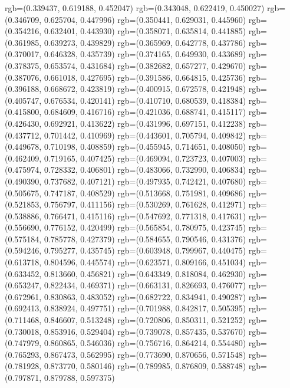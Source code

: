 {{{					rgb=(0.339437, 0.619188, 0.452047)
					rgb=(0.343048, 0.622419, 0.450027)
					rgb=(0.346709, 0.625704, 0.447996)
					rgb=(0.350441, 0.629031, 0.445960)
					rgb=(0.354216, 0.632401, 0.443930)
					rgb=(0.358071, 0.635814, 0.441885)
					rgb=(0.361985, 0.639273, 0.439829)
					rgb=(0.365969, 0.642778, 0.437786)
					rgb=(0.370017, 0.646328, 0.435739)
					rgb=(0.374165, 0.649930, 0.433689)
					rgb=(0.378375, 0.653574, 0.431684)
					rgb=(0.382682, 0.657277, 0.429670)
					rgb=(0.387076, 0.661018, 0.427695)
					rgb=(0.391586, 0.664815, 0.425736)
					rgb=(0.396188, 0.668672, 0.423819)
					rgb=(0.400915, 0.672578, 0.421948)
					rgb=(0.405747, 0.676534, 0.420141)
					rgb=(0.410710, 0.680539, 0.418384)
					rgb=(0.415800, 0.684609, 0.416716)
					rgb=(0.421036, 0.688741, 0.415117)
					rgb=(0.426430, 0.692921, 0.413622)
					rgb=(0.431996, 0.697151, 0.412238)
					rgb=(0.437712, 0.701442, 0.410969)
					rgb=(0.443601, 0.705794, 0.409842)
					rgb=(0.449678, 0.710198, 0.408859)
					rgb=(0.455945, 0.714651, 0.408050)
					rgb=(0.462409, 0.719165, 0.407425)
					rgb=(0.469094, 0.723723, 0.407003)
					rgb=(0.475974, 0.728332, 0.406801)
					rgb=(0.483066, 0.732990, 0.406834)
					rgb=(0.490390, 0.737682, 0.407121)
					rgb=(0.497935, 0.742421, 0.407680)
					rgb=(0.505675, 0.747187, 0.408529)
					rgb=(0.513668, 0.751981, 0.409686)
					rgb=(0.521853, 0.756797, 0.411156)
					rgb=(0.530269, 0.761628, 0.412971)
					rgb=(0.538886, 0.766471, 0.415116)
					rgb=(0.547692, 0.771318, 0.417631)
					rgb=(0.556690, 0.776152, 0.420499)
					rgb=(0.565854, 0.780975, 0.423745)
					rgb=(0.575184, 0.785778, 0.427379)
					rgb=(0.584655, 0.790546, 0.431376)
					rgb=(0.594246, 0.795277, 0.435745)
					rgb=(0.603948, 0.799967, 0.440475)
					rgb=(0.613718, 0.804596, 0.445574)
					rgb=(0.623571, 0.809166, 0.451034)
					rgb=(0.633452, 0.813660, 0.456821)
					rgb=(0.643349, 0.818084, 0.462930)
					rgb=(0.653247, 0.822434, 0.469371)
					rgb=(0.663131, 0.826693, 0.476077)
					rgb=(0.672961, 0.830863, 0.483052)
					rgb=(0.682722, 0.834941, 0.490287)
					rgb=(0.692413, 0.838924, 0.497751)
					rgb=(0.701988, 0.842817, 0.505395)
					rgb=(0.711468, 0.846607, 0.513248)
					rgb=(0.720806, 0.850311, 0.521252)
					rgb=(0.730018, 0.853916, 0.529404)
					rgb=(0.739078, 0.857435, 0.537670)
					rgb=(0.747979, 0.860865, 0.546036)
					rgb=(0.756716, 0.864214, 0.554480)
					rgb=(0.765293, 0.867473, 0.562995)
					rgb=(0.773690, 0.870656, 0.571548)
					rgb=(0.781928, 0.873770, 0.580146)
					rgb=(0.789985, 0.876809, 0.588748)
					rgb=(0.797871, 0.879788, 0.597375)
}}}
